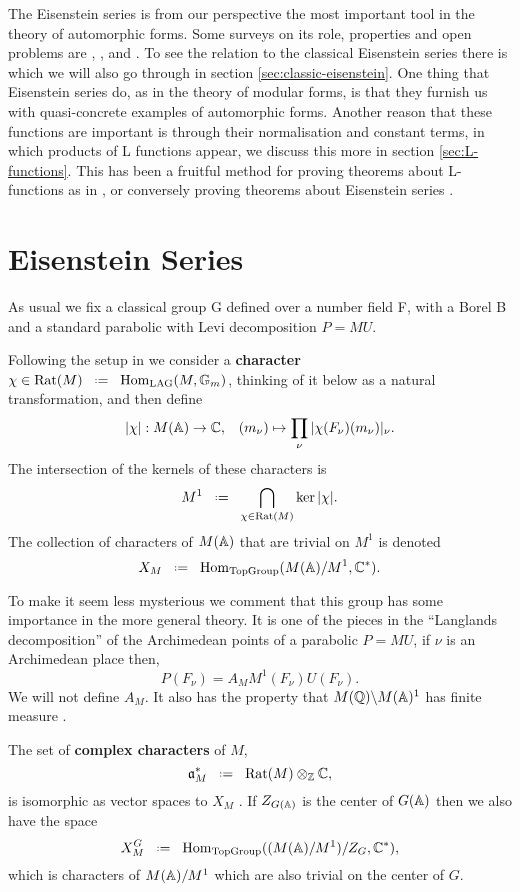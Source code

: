 The Eisenstein series is from our perspective the most important tool in the theory of automorphic forms. Some surveys on its role, properties and open problems are \cite{lapidPerspectivesEisensteinSeries2022}, \cite{arthurEisensteinSeriesTrace1979}, \cite{kimEISENSTEINSERIESTHEIR} and \cite{jiangResiduesEisensteinSeries2008a}. To see the relation to the classical Eisenstein series there is \cite{garrettTransitionEisensteinSeries2016} which we will also go through in section \ref{sec:classic-eisenstein}. One thing that Eisenstein series do, as in the theory of modular forms, is that they furnish us with quasi-concrete examples of automorphic forms. Another reason that these functions are important is through their normalisation and constant terms, in which products of L functions appear, we discuss this more in section \ref{sec:L-functions}. This has been a fruitful method for proving theorems about L-functions as in \cite{shahidiEisensteinSeriesAutomorphic2010}\cite{pollackRANKINSELBERGMETHODUSERS}\cite{arthurEisensteinSeriesTrace1979}, or conversely proving theorems about Eisenstein series \cite{jiangPolesCertainResidual2013}.

\section{Eisenstein Series}\label{sec:eisenstein-series}
As usual we fix a classical group G defined over a number field F, with a Borel B and a standard parabolic with Levi decomposition \(P = MU\). 

Following the setup in \cite[I.1.4]{moeglinSpectralDecompositionEisenstein1995} we consider a \textbf{character} \(\chi\in \mathrm{Rat}(M) \defeq \Hom_{\mathrm{LAG}}(M, \mathbb{G}_m)\), thinking of it below as a natural transformation, and then define 
\[|\chi|: M(\A)\to \C , \;\;\; (m_\nu)\mapsto \prod_\nu|\chi(F_\nu)(m_\nu)|_\nu.\]
The intersection of the kernels of these characters is 
\[M^1 \defeq \bigcap_{\chi\in \mathrm{Rat}(M)}\ker |\chi|.\]
The collection of characters of \(M(\A)\) that are trivial on \(M^1\) is denoted
\[X_M \defeq \Hom_{\textrm{TopGroup}}(M(\A)/M^1, \C^*) .\]

\begin{remark}
    To make it seem less mysterious we comment that this group has some importance in the more general theory. It is one of the pieces in the ``Langlands decomposition'' of the Archimedean points of a parabolic \(P = MU\), if \(\nu\) is an Archimedean place then,
    \[P(F_\nu) = A_M M^1(F_\nu)U(F_\nu).\]
    We will not define \(A_M\).
    It also has the property that \(M(\Q)\backslash M(\A)^1\) has finite measure \cite[4.9]{getzIntroductionAutomorphicRepresentations2024}.
\end{remark}
The set of \textbf{complex characters} of \(M\),
\[\mathfrak{a}_M^* \defeq \mathrm{Rat}(M)\tensor_\Z \C,\]
is isomorphic as \C vector spaces to \(X_M\) \cite[I.1.4]{moeglinSpectralDecompositionEisenstein1995}. If \(Z_{G(\A)}\) is the center of \(G(\A)\) then we also have the space 
\[X_M^G \defeq \Hom_{\textrm{TopGroup}}((M(\A)/M^1)/Z_G, \C^*),\]
which is characters of \(M(\A)/M^1\) which are also trivial on the center of \(G\).

